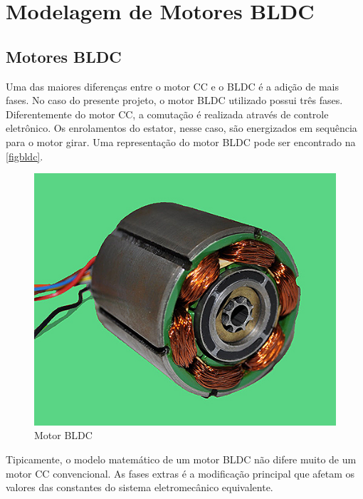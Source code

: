 \documentclass[
	12pt,				%
	openright,			%
	oneside,			%
	a4paper,			%
	english,			%
	french,				%
	spanish,			%
	brazil,				%
	]{abntex2}
\begin{document}
\chapter{Modelagem de Motores BLDC}

\section{Motores BLDC}

Uma das maiores diferenças entre o motor CC e o BLDC é a adição de mais fases. No caso do presente projeto, o motor BLDC utilizado possui três fases. Diferentemente do motor CC, a comutação é realizada através de controle eletrônico. Os enrolamentos do estator, nesse caso, são energizados em sequência para o motor girar. Uma representação do motor BLDC pode ser encontrado na \autoref{figbldc}.

\begin{figure}[htb]
	\caption{\label{figbldc}Motor BLDC}
	\begin{center}
	  \includegraphics[scale=0.4]{figuras/figbldc.jpg}
	\end{center}
\end{figure}

Tipicamente, o modelo matemático de um motor BLDC não difere muito de um motor CC convencional. As fases extras é a modificação principal que afetam os valores das constantes do sistema eletromecânico equivalente.
\end{document}
